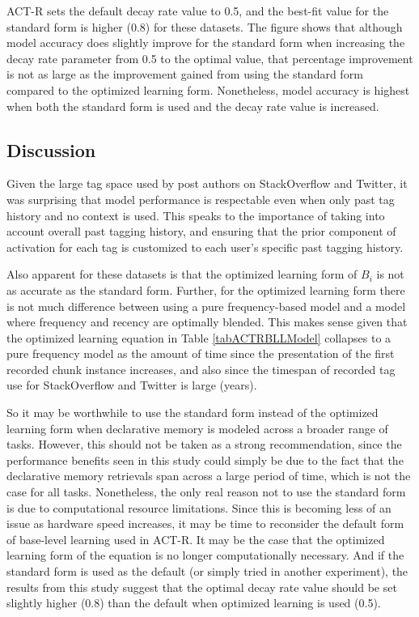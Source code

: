 \documentclass[man,donotrepeattitle]{apa6}
\begin{document}
ACT-R sets the default decay rate value to \num{0.5}, and the best-fit value for the standard form is higher (\num{0.8}) for these datasets.
The figure shows that although model accuracy does slightly improve for the standard form when increasing the decay rate parameter from \num{0.5} to the optimal value,
that percentage improvement is not as large as the improvement gained from using the standard form compared to the optimized learning form.
Nonetheless, model accuracy is highest when both the standard form is used and the decay rate value is increased. 

\subsection{Discussion}

Given the large tag space used by post authors on StackOverflow and Twitter, it was surprising that model performance is respectable even when only past tag history and no context is used.
This speaks to the importance of taking into account overall past tagging history, and ensuring that the prior component of activation for each tag is customized to each user's specific past tagging history.

Also apparent for these datasets is that the optimized learning form of $B_{i}$ is not as accurate as the standard form.
Further, for the optimized learning form there is not much difference between using a pure frequency-based model and a model where frequency and recency are optimally blended.
This makes sense given that the optimized learning equation in Table \ref{tabACTRBLLModel} collapses to a pure frequency model as the amount of time since the presentation of the first recorded chunk instance increases,
and also since the timespan of recorded tag use for StackOverflow and Twitter is large (years).

So it may be worthwhile to use the standard form instead of the optimized learning form when declarative memory is modeled across a broader range of tasks.
However, this should not be taken as a strong recommendation,
since the performance benefits seen in this study could simply be due to the fact that the declarative memory retrievals span across a large period of time, which is not the case for all tasks.
Nonetheless, the only real reason not to use the standard form is due to computational resource limitations.
Since this is becoming less of an issue as hardware speed increases, it may be time to reconsider the default form of base-level learning used in ACT-R.
It may be the case that the optimized learning form of the equation is no longer computationally necessary.
And if the standard form is used as the default (or simply tried in another experiment),
the results from this study suggest that the optimal decay rate value should be set slightly higher (\num{0.8}) than the default when optimized learning is used (\num{0.5}).
\end{document}
